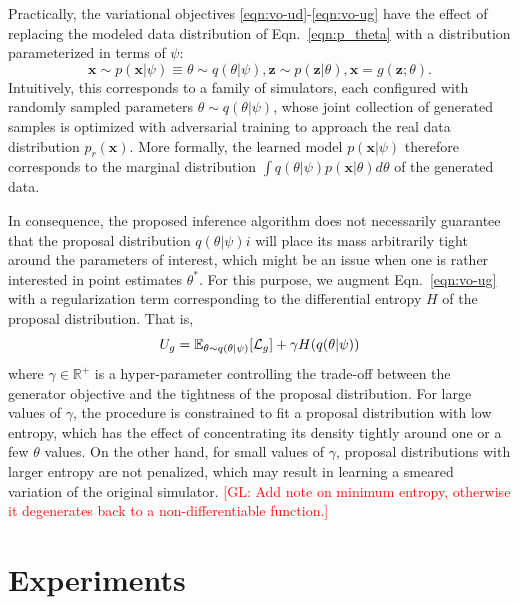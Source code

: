 \documentclass[twocolumn,superscriptaddress,aps]{revtex4-1}
\newcommand{\glnote}[1]{\textcolor{red}{[GL: #1]}}
\theoremstyle{plain}
\begin{document}
Practically, the variational objectives \ref{eqn:vo-ud}-\ref{eqn:vo-ug}
have the effect of replacing the modeled data distribution of Eqn.~\ref{eqn:p_theta} with
a distribution parameterized in terms of $\psi$:
\begin{equation}\label{eqn:p_psi}
    \mathbf{x} \sim p(\mathbf{x}|\psi) \equiv \theta \sim q(\theta|\psi), \mathbf{z} \sim p(\mathbf{z}|\theta), \mathbf{x} = g(\mathbf{z}; \theta).
\end{equation}
Intuitively, this corresponds to a family of simulators, each configured
with randomly sampled parameters $\theta \sim q(\theta|\psi)$, whose joint collection
of generated samples is optimized with adversarial training to approach the real data distribution $p_r(\mathbf{x})$.
More formally, the learned model $p(\mathbf{x}|\psi)$ therefore corresponds to the marginal distribution
$\int q(\theta|\psi) p(\mathbf{x}|\theta) d\theta$ of the generated data.

In consequence, the proposed inference algorithm does not necessarily guarantee that the
proposal distribution $q(\theta|\psi)i$ will place its mass arbitrarily tight
around the parameters of interest, which might be an issue when one is rather interested in point estimates $\theta^*$.
For this purpose, we augment Eqn.~\ref{eqn:vo-ug}
with a regularization term corresponding to the differential entropy $H$ of
the proposal distribution. That is,
\begin{equation}
    U_g = \mathbb{E}_{\theta \sim q(\theta|\psi)} [ {\cal L}_g ] + \gamma H(q(\theta|\psi))
\end{equation}
where $\gamma \in \mathbb{R}^+$ is a hyper-parameter controlling the trade-off
between the generator objective and the tightness of the proposal distribution.
For large values of $\gamma$, the procedure is constrained to fit a proposal
distribution with low entropy, which has the effect of concentrating its density
tightly around one or a few $\theta$ values. On the other hand, for small values of $\gamma$,
proposal distributions with larger entropy are not penalized, which may result
in learning a smeared variation of the original simulator.
\glnote{Add note on minimum entropy, otherwise it degenerates back to a non-differentiable function.}






\section{Experiments}
\end{document}
